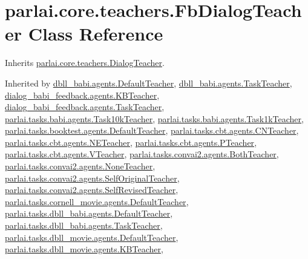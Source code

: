 \hypertarget{classparlai_1_1core_1_1teachers_1_1FbDialogTeacher}{}\section{parlai.\+core.\+teachers.\+Fb\+Dialog\+Teacher Class Reference}
\label{classparlai_1_1core_1_1teachers_1_1FbDialogTeacher}


Inherits \hyperlink{classparlai_1_1core_1_1teachers_1_1DialogTeacher}{parlai.\+core.\+teachers.\+Dialog\+Teacher}.



Inherited by \hyperlink{classdbll__babi_1_1agents_1_1DefaultTeacher}{dbll\+\_\+babi.\+agents.\+Default\+Teacher}, \hyperlink{classdbll__babi_1_1agents_1_1TaskTeacher}{dbll\+\_\+babi.\+agents.\+Task\+Teacher}, \hyperlink{classdialog__babi__feedback_1_1agents_1_1KBTeacher}{dialog\+\_\+babi\+\_\+feedback.\+agents.\+K\+B\+Teacher}, \hyperlink{classdialog__babi__feedback_1_1agents_1_1TaskTeacher}{dialog\+\_\+babi\+\_\+feedback.\+agents.\+Task\+Teacher}, \hyperlink{classparlai_1_1tasks_1_1babi_1_1agents_1_1Task10kTeacher}{parlai.\+tasks.\+babi.\+agents.\+Task10k\+Teacher}, \hyperlink{classparlai_1_1tasks_1_1babi_1_1agents_1_1Task1kTeacher}{parlai.\+tasks.\+babi.\+agents.\+Task1k\+Teacher}, \hyperlink{classparlai_1_1tasks_1_1booktest_1_1agents_1_1DefaultTeacher}{parlai.\+tasks.\+booktest.\+agents.\+Default\+Teacher}, \hyperlink{classparlai_1_1tasks_1_1cbt_1_1agents_1_1CNTeacher}{parlai.\+tasks.\+cbt.\+agents.\+C\+N\+Teacher}, \hyperlink{classparlai_1_1tasks_1_1cbt_1_1agents_1_1NETeacher}{parlai.\+tasks.\+cbt.\+agents.\+N\+E\+Teacher}, \hyperlink{classparlai_1_1tasks_1_1cbt_1_1agents_1_1PTeacher}{parlai.\+tasks.\+cbt.\+agents.\+P\+Teacher}, \hyperlink{classparlai_1_1tasks_1_1cbt_1_1agents_1_1VTeacher}{parlai.\+tasks.\+cbt.\+agents.\+V\+Teacher}, \hyperlink{classparlai_1_1tasks_1_1convai2_1_1agents_1_1BothTeacher}{parlai.\+tasks.\+convai2.\+agents.\+Both\+Teacher}, \hyperlink{classparlai_1_1tasks_1_1convai2_1_1agents_1_1NoneTeacher}{parlai.\+tasks.\+convai2.\+agents.\+None\+Teacher}, \hyperlink{classparlai_1_1tasks_1_1convai2_1_1agents_1_1SelfOriginalTeacher}{parlai.\+tasks.\+convai2.\+agents.\+Self\+Original\+Teacher}, \hyperlink{classparlai_1_1tasks_1_1convai2_1_1agents_1_1SelfRevisedTeacher}{parlai.\+tasks.\+convai2.\+agents.\+Self\+Revised\+Teacher}, \hyperlink{classparlai_1_1tasks_1_1cornell__movie_1_1agents_1_1DefaultTeacher}{parlai.\+tasks.\+cornell\+\_\+movie.\+agents.\+Default\+Teacher}, \hyperlink{classparlai_1_1tasks_1_1dbll__babi_1_1agents_1_1DefaultTeacher}{parlai.\+tasks.\+dbll\+\_\+babi.\+agents.\+Default\+Teacher}, \hyperlink{classparlai_1_1tasks_1_1dbll__babi_1_1agents_1_1TaskTeacher}{parlai.\+tasks.\+dbll\+\_\+babi.\+agents.\+Task\+Teacher}, \hyperlink{classparlai_1_1tasks_1_1dbll__movie_1_1agents_1_1DefaultTeacher}{parlai.\+tasks.\+dbll\+\_\+movie.\+agents.\+Default\+Teacher}, \hyperlink{classparlai_1_1tasks_1_1dbll__movie_1_1agents_1_1KBTeacher}{parlai.\+tasks.\+dbll\+\_\+movie.\+agents.\+K\+B\+Teacher}, 